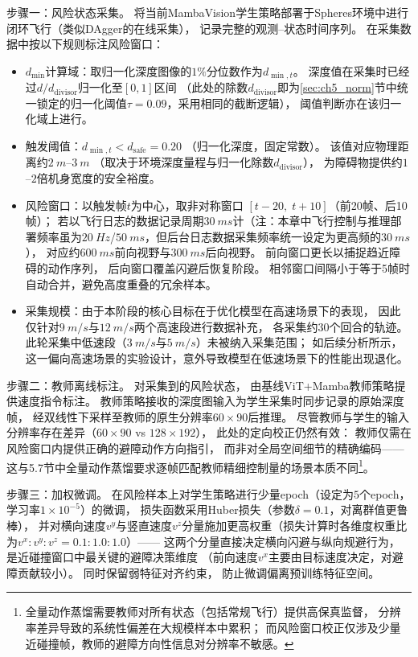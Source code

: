 步骤一：风险状态采集。
将当前MambaVision学生策略部署于Spheres环境中进行闭环飞行（类似DAgger的在线采集），
记录完整的观测--状态时间序列。
在采集数据中按以下规则标注风险窗口：
\begin{itemize}
  \item $d_{\min}$计算域：取归一化深度图像的$1\%$分位数作为$d_{\min,t}$。
    深度值在采集时已经过$d / d_{\text{divisor}}$归一化至$[0, 1]$区间
    （此处的除数$d_{\text{divisor}}$即为\ref{sec:ch5_norm}节中统一锁定的归一化阈值$\tau=0.09$，采用相同的截断逻辑），
    阈值判断亦在该归一化域上进行。
  \item 触发阈值：$d_{\min,t} < d_{\text{safe}} = 0.20$
    （归一化深度，固定常数）。
    该值对应物理距离约$\SI{2}{m}$--$\SI{3}{m}$
    （取决于环境深度量程与归一化除数$d_{\text{divisor}}$），
    为障碍物提供约$1$--$2$倍机身宽度的安全裕度。
  \item 风险窗口：以触发帧$t$为中心，取非对称窗口
    $[t - 20,\; t + 10]$（前20帧、后10帧）；
    若以飞行日志的数据记录周期$\SI{30}{ms}$计（注：本章中飞行控制与推理部署频率虽为$\SI{20}{Hz}$/$\SI{50}{ms}$，但后台日志数据采集频率统一设定为更高频的$\SI{30}{ms}$），
    对应约$\SI{600}{ms}$前向视野与$\SI{300}{ms}$后向视野。
    前向窗口更长以捕捉趋近障碍的动作序列，
    后向窗口覆盖闪避后恢复阶段。
    相邻窗口间隔小于等于5帧时自动合并，避免高度重叠的冗余样本。
  \item 采集规模：由于本阶段的核心目标在于优化模型在高速场景下的表现，
    因此仅针对$\SI{9}{m/s}$与$\SI{12}{m/s}$两个高速段进行数据补充，
    各采集约30个回合的轨迹。
    此轮采集中低速段（$\SI{3}{m/s}$与$\SI{5}{m/s}$）未被纳入采集范围；
    如后续分析所示，这一偏向高速场景的实验设计，意外导致模型在低速场景下的性能出现退化。
\end{itemize}

步骤二：教师离线标注。
对采集到的风险状态，
由基线ViT+Mamba教师策略提供速度指令标注。
教师策略接收的深度图输入为学生采集时同步记录的原始深度帧，
经双线性下采样至教师的原生分辨率$60 \times 90$后推理。
尽管教师与学生的输入分辨率存在差异（$60 \times 90$ vs $128 \times 192$），
此处的定向校正仍然有效：
教师仅需在风险窗口内提供正确的避障动作方向指引，
而非对全局空间细节的精确编码——
这与5.7节中全量动作蒸馏要求逐帧匹配教师精细控制量的场景本质不同\footnote{全量动作蒸馏需要教师对所有状态（包括常规飞行）提供高保真监督，
分辨率差异导致的系统性偏差在大规模样本中累积；
而风险窗口校正仅涉及少量近碰撞帧，教师的避障方向性信息对分辨率不敏感。}。

步骤三：加权微调。
在风险样本上对学生策略进行少量epoch（设定为$5$个epoch，学习率$1\times10^{-5}$）的微调，
损失函数采用Huber损失（参数$\delta=0.1$，对离群值更鲁棒），
并对横向速度$v^y$与竖直速度$v^z$分量施加更高权重（损失计算时各维度权重比为$v^x:v^y:v^z = 0.1:1.0:1.0$）——
这两个分量直接决定横向闪避与纵向规避行为，
是近碰撞窗口中最关键的避障决策维度
（前向速度$v^x$主要由目标速度决定，对避障贡献较小）。
同时保留弱特征对齐约束，
防止微调偏离预训练特征空间。

